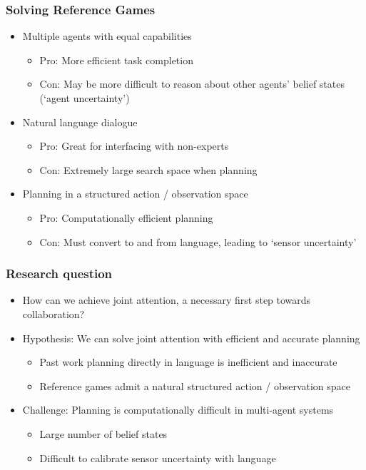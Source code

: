 \documentclass{beamer}
\begin{document}
\begin{frame}
\frametitle{Solving Reference Games}
\begin{itemize}
\item Multiple agents with equal capabilities
    \begin{itemize}
    \item Pro: More efficient task completion
    \item Con: May be more difficult to reason about other agents' belief states
        (`agent uncertainty')
    \end{itemize}
\item Natural language dialogue
    \begin{itemize}
    \item Pro: Great for interfacing with non-experts
    \item Con: Extremely large search space when planning
    \end{itemize}
\item Planning in a structured action / observation space
    \begin{itemize}
    \item Pro: Computationally efficient planning
    \item Con: Must convert to and from language, leading to `sensor uncertainty'
    \end{itemize}
\end{itemize}
\end{frame}

\begin{frame}
\frametitle{Research question}
\begin{itemize}
\item How can we achieve joint attention, a necessary first step towards collaboration?
\item Hypothesis: We can solve joint attention with efficient and accurate planning
    \begin{itemize}
    \item Past work planning directly in language is inefficient and inaccurate
    \item Reference games admit a natural structured action / observation space
    \end{itemize}
\item Challenge: Planning is computationally difficult in multi-agent systems
    \begin{itemize}
    \item Large number of belief states
    \item Difficult to calibrate sensor uncertainty with language
    \end{itemize}
\end{itemize}
\end{frame}
\end{document}
